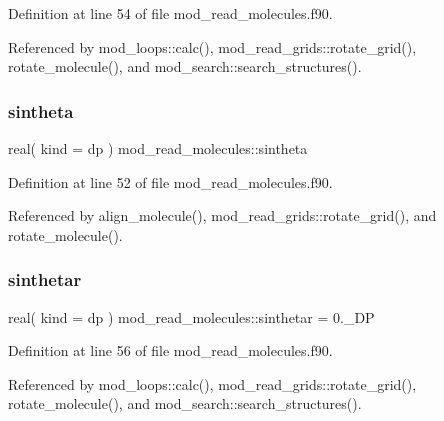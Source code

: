 Definition at line 54 of file mod\+\_\+read\+\_\+molecules.\+f90.



Referenced by mod\+\_\+loops\+::calc(), mod\+\_\+read\+\_\+grids\+::rotate\+\_\+grid(), rotate\+\_\+molecule(), and mod\+\_\+search\+::search\+\_\+structures().

\mbox{\label{namespacemod__read__molecules_a4bb74ab5f27ab9f8418a9174422796c4}} 
\subsubsection{\texorpdfstring{sintheta}{sintheta}}
{\footnotesize\ttfamily real( kind = dp ) mod\+\_\+read\+\_\+molecules\+::sintheta}



Definition at line 52 of file mod\+\_\+read\+\_\+molecules.\+f90.



Referenced by align\+\_\+molecule(), mod\+\_\+read\+\_\+grids\+::rotate\+\_\+grid(), and rotate\+\_\+molecule().

\mbox{\label{namespacemod__read__molecules_a8f483c69b7c8592ed311a0ba7b816e4a}} 
\subsubsection{\texorpdfstring{sinthetar}{sinthetar}}
{\footnotesize\ttfamily real( kind = dp ) mod\+\_\+read\+\_\+molecules\+::sinthetar = 0.\+\_\+\+DP}



Definition at line 56 of file mod\+\_\+read\+\_\+molecules.\+f90.



Referenced by mod\+\_\+loops\+::calc(), mod\+\_\+read\+\_\+grids\+::rotate\+\_\+grid(), rotate\+\_\+molecule(), and mod\+\_\+search\+::search\+\_\+structures().

